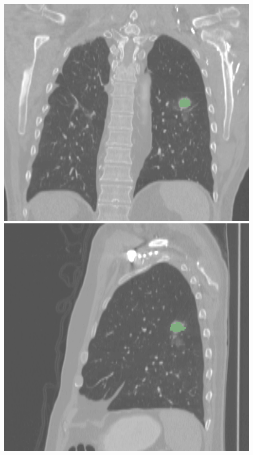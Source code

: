 \documentclass[12pt]{article}
\begin{document}
\includegraphics{LUNG1}
\includegraphics{LUNG2}
\end{document}
